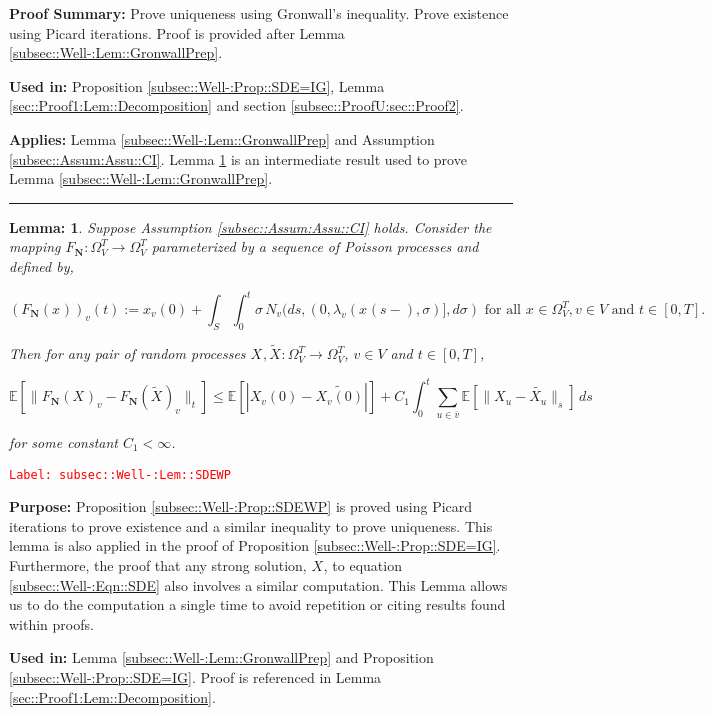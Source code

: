 \documentclass[12pt]{article}
\newcommand{\mb}{\mathbb}
\newcommand{\ra}{\rightarrow}
\newcommand{\ov}{\overline}
\newcommand{\te}{\text}
\newcommand{\tr}{\textcolor{red}}
\newcommand{\labe}[1]{\tr{\texttt{Label: #1}}}
\newcommand{\purpose}{\textbf{Purpose: }}
\newcommand{\pfsum}{\textbf{Proof Summary: }}
\newcommand{\usein}{\textbf{Used in: }}
\newcommand{\app}{\textbf{Applies: }}
\newcommand{\lin}{\rule{\linewidth}{0.4 pt}}
\newcommand{\ex}[1]{\mb{E}\left[#1\right]}			%
\renewcommand{\v}{v}							%
\newcommand{\vv}{u}								%
\newcommand{\cl}{\ov}							%
\renewcommand{\S}{S}							%
\newcommand{\s}{\sigma}							%
\newcommand{\T}{T}								%
\newcommand{\OmegaV}[2]{\Omega_{#1}^{#2}}		%
\renewcommand{\t}{t}							%
\newcommand{\poiss}[1]{N_{#1}}						%
\newcommand{\poisses}{\mathbf{N}}				%
\newcommand{\V}{V}									%
\renewcommand{\tt}{s}								%
\newcommand{\xvt}[2]{x_{#1}{(#2)}}					%
\newcommand{\rxvt}[2]{X_{#1}{(#2)}}					%
\newcommand{\xvts}[2]{x_{#1}{#2}}					%
\newcommand{\rxvts}[2]{X_{#1}{#2}}					%
\newcommand{\rate}[1]{\lambda_{#1}}					%
\newcommand{\const}[1]{C_{#1}}						%
\newcommand{\alt}{\widetilde}						%
\newtheorem{lem}[thms]{Lemma: }
\begin{document}
\pfsum Prove uniqueness using Gronwall's inequality. Prove existence using Picard iterations. Proof is provided after Lemma \ref{subsec::Well-:Lem::GronwallPrep}.

\usein Proposition \ref{subsec::Well-:Prop::SDE=IG}, Lemma \ref{sec::Proof1:Lem::Decomposition} and section \ref{subsec::ProofU:sec::Proof2}.

\app Lemma \ref{subsec::Well-:Lem::GronwallPrep} and Assumption \ref{subsec::Assum:Assu::CI}. Lemma \ref{subsec::Well-:Lem::SDEWP} is an intermediate result used to prove Lemma \ref{subsec::Well-:Lem::GronwallPrep}.

\lin

\begin{lem}
Suppose Assumption \ref{subsec::Assum:Assu::CI} holds. Consider the mapping \(F_\poisses: \OmegaV{\V}{\T} \ra \OmegaV{\V}{\T}\) parameterized by a sequence of Poisson processes and defined by,

\[\left(F_\poisses(\xvts{}{})\right)_\v(\t) := \xvt{\v}{0} + \int_\S\int_0^\t \s \,\poiss{\v}(d\tt,(0,\rate{\v}(\xvt{}{\tt-},\s)],d\s) \te{ for all }\xvts{}{} \in \OmegaV{\V}{\T}, \v \in \V\te{ and }\t \in [0,\T].\]

Then for any pair of random processes \(\rxvts{}{},\alt{\rxvts{}{}}:\OmegaV{\V}{\T} \ra \OmegaV{\V}{\T}\), \(\v\in \V\) and \(\t \in [0,\T]\),

\[\ex{\|F_\poisses(\rxvts{}{})_\v - F_\poisses(\alt{\rxvts{}{}})_\v\|_\t} \leq \ex{|\rxvt{\v}{0} - \alt{\rxvt{\v}{0}}|} +  \const{1}\int_0^\t \sum_{\vv\in \cl{\v}} \ex{\|\rxvts{\vv}{} - \alt{\rxvts{\vv}{}}\|_\tt}\,d\tt\]

for some constant \(\const{1} < \infty\).

\label{subsec::Well-:Lem::SDEWP}
\end{lem}
\labe{subsec::Well-:Lem::SDEWP}

\purpose Proposition \ref{subsec::Well-:Prop::SDEWP} is proved using Picard iterations to prove existence and a similar inequality to prove uniqueness. This lemma is also applied in the proof of Proposition \ref{subsec::Well-:Prop::SDE=IG}. Furthermore, the proof that any strong solution, \(\rxvts{}{}\), to equation \eqref{subsec::Well-:Eqn::SDE} also involves a similar computation. This Lemma allows us to do the computation a single time to avoid repetition or citing results found within proofs.

\usein Lemma \ref{subsec::Well-:Lem::GronwallPrep} and Proposition \ref{subsec::Well-:Prop::SDE=IG}. Proof is referenced in Lemma \ref{sec::Proof1:Lem::Decomposition}.
\end{document}
